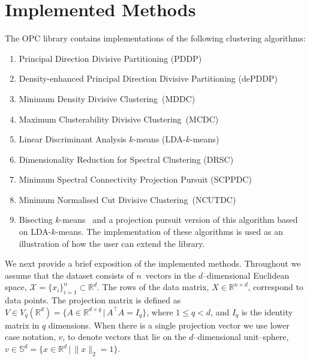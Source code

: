 \documentclass{book}
\def\R{\mathbb{R}}
\begin{document}


\chapter{Implemented Methods}

The OPC library contains implementations of the following clustering
algorithms:

\begin{enumerate}

\item Principal Direction Divisive Partitioning (PDDP)~\cite{Boley1998}

\item Density-enhanced Principal Direction Divisive Partitioning (dePDDP)~\cite{TasoulisTP2010}

\item Minimum Density Divisive Clustering~(MDDC)~\cite{PavlidisHT2016}

\item Maximum Clusterability Divisive Clustering~(MCDC)~\cite{HofmeyrP2015}

\item Linear Discriminant Analysis $k$-means (LDA-$k$-means)~\cite{DingL2007}

\item Dimensionality Reduction for Spectral Clustering (DRSC)~\cite{NiuDJ2011,NiuDJ2014}

\item Minimum Spectral Connectivity Projection Pursuit (SCPPDC)~\cite{HofmeyrPE2018}

\item Minimum Normalised Cut Divisive Clustering~(NCUTDC)~\cite{Hofmeyr2017}

\item Bisecting $k$-means~\cite{SteinbachKK2000} and a projection pursuit
version of this algorithm based on LDA-$k$-means.
The implementation of these
algorithms is used as an illustration of how the user can extend the library.

\end{enumerate}


\noindent
%
We next provide a brief exposition of the implemented methods.
Throughout we assume that the
dataset consists of $n$~vectors in the $d$--dimensional Euclidean space,
$\mathcal{X} = \{x_i\}_{i=1}^n \subset \R^d$.
%
The rows of the data matrix,
$X \in \R^{n \times d}$, correspond to data points. 
%
The projection matrix is defined as
%
$V \in V_q(\R^d) = \{A \in \R^{d \times q} \,|\, A^\top A = I_q\}$, where 
$1\leqslant q<d$, and $I_q$ is the identity matrix in $q$ dimensions.
%
When there is a single projection vector we use lower case notation, $v$,
to denote vectors that lie on the $d$--dimensional unit--sphere,
$v \in \mathbb{S}^{d} = \{ x \in \R^d \,|\, \|x\|_2=1\}$.
\end{document}
